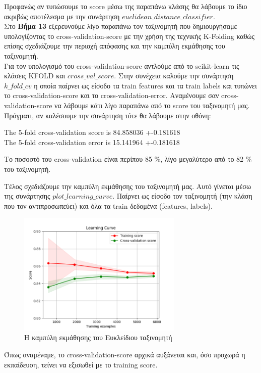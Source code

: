 \documentclass[11pt]{article} %
\begin{document}
Προφανώς αν τυπώσουμε το score μέσω της παραπάνω κλάσης θα λάβουμε το ίδιο ακριβώς αποτέλεσμα με την συνάρτηση $euclidean\_distance\_classifier$.\\

Στο \textbf{Βήμα 13} εξερευνούμε λίγο παραπάνω τον ταξινομητή που δημιουργήσαμε υπολογίζοντας το cross-validation-score με την χρήση της τεχνικής K-Folding καθώς επίσης σχεδιάζουμε την περιοχή απόφασης και την καμπύλη εκμάθησης του ταξινομητή.\\

Για τον υπολογισμό του cross-validation-score αντλούμε από το scikit-learn τις κλάσεις ΚFOLD και $cross\_val\_score$. Στην συνέχεια καλούμε την συνάρτηση $k\_fold\_cv$ η οποία παίρνει ως είσοδο τα train features και τα train labels και τυπώνει το cross-validation-score και το cross-validation-error. Αναμένουμε σαν cross-validation-score να λάβουμε κάτι λίγο παραπάνω από το score του ταξινομητή μας. Πράγματι, αν καλέσουμε την συνάρτηση τότε θα λάβουμε στην οθόνη:
\begin{center}
The 5-fold cross-validation score is 84.858036 +-0.181618\\
The 5-fold cross-validation error is 15.141964 +-0.181618
\end{center}

Το ποσοστό του cross-validation είναι περίπου 85 \%, λίγο μεγαλύτερο από το 82 \% του ταξινομητή.



Τέλος σχεδιάζουμε την καμπύλη εκμάθησης του ταξινομητή μας. Αυτό γίνεται μέσω της συνάρτησης $plot\_learning\_curve$. Παίρνει ως είσοδο τον ταξινομητή (την κλάση που τον αντιπροσωπεύει) και όλα τα train δεδομένα (features, labels). 

\begin{figure}[H]
    \centering
    \includegraphics[width=0.7\textwidth]{plots/learning_curve.png}
    \caption{Η καμπύλη εκμάθησης του Ευκλείδιου ταξινομητή}
    \label{fig:learningcurve}
\end{figure}

Όπως αναμέναμε, το cross-validation-score αρχικά αυξάνεται και, όσο προχωρά η εκπαίδευση, τείνει να εξισωθεί με το training score.

 
\end{document}

